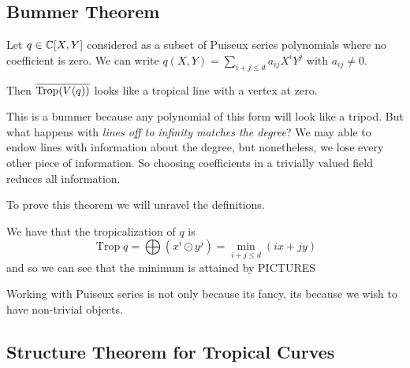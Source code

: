 \documentclass[12pt]{memoir}
\DeclareMathOperator{\Trop}{Trop}
\begin{document}
\subsection{Bummer Theorem}

\begin{Th} 
    Let $q\in\mathbb{C}[X,Y]$ considered as a subset of Puiseux series polynomials where no coefficient is zero. We can write $q(X,Y)=\sum_{i+j\leq d}a_{ij}X^iY^j$ with $a_{ij}\neq 0$.\par 
    Then $\ov{\Trop(V(q))}$ looks like a tropical line with a vertex at zero.
\end{Th}

This is a bummer because any polynomial of this form will look like a tripod. But what happens with \emph{lines off to infinity matches the degree}? We may able to endow lines with information about the degree, but nonetheless, we lose every other piece of information. So choosing coefficients in a trivially valued field reduces all information.\par 
To prove this theorem we will unravel the definitions.

\begin{ptcbp}
We have that the tropicalization of $q$ is 
$$\Trop q=\bigoplus(x^i\odot y^j)=\min_{i+j\leq d}(ix+jy)$$
and so we can see that the minimum is attained by PICTURES
\end{ptcbp}

Working with Puiseux series is not only because its fancy, its because we wish to have non-trivial objects.

\subsection{Structure Theorem for Tropical Curves}
\end{document}
